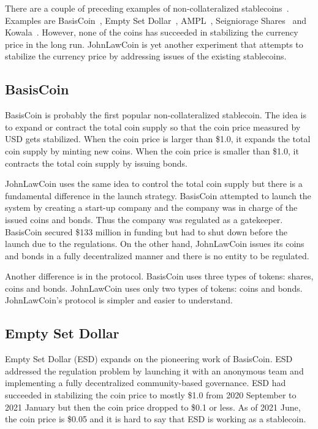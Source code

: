 \documentclass[dvipdfmx,a4paper]{article}
\begin{document}
There are a couple of preceding examples of non-collateralized stablecoins~\cite{mita2019stablecoin,klages2020stablecoins}. Examples are BasisCoin~\cite{basiscoin}, Empty Set Dollar~\cite{emptysetdollar}, AMPL~\cite{ampl}, Seigniorage Shares~\cite{seigniorage} and Kowala~\cite{kowala}. However, none of the coins has succeeded in stabilizing the currency price in the long run. JohnLawCoin is yet another experiment that attempts to stabilize the currency price by addressing issues of the existing stablecoins.

\subsection{BasisCoin}

BasisCoin is probably the first popular non-collateralized stablecoin. The idea is to expand or contract the total coin supply so that the coin price measured by USD gets stabilized. When the coin price is larger than \$1.0, it expands the total coin supply by minting new coins. When the coin price is smaller than \$1.0, it contracts the total coin supply by issuing bonds.

JohnLawCoin uses the same idea to control the total coin supply but there is a fundamental difference in the launch strategy. BasisCoin attempted to launch the system by creating a start-up company and the company was in charge of the issued coins and bonds. Thus the company was regulated as a gatekeeper. BasisCoin secured \$133 million in funding but had to shut down before the launch due to the regulations. On the other hand, JohnLawCoin issues its coins and bonds in a fully decentralized manner and there is no entity to be regulated.

Another difference is in the protocol. BasisCoin uses three types of tokens: shares, coins and bonds. JohnLawCoin uses only two types of tokens: coins and bonds. JohnLawCoin's protocol is simpler and easier to understand.

\subsection{Empty Set Dollar}

Empty Set Dollar (ESD) expands on the pioneering work of BasisCoin. ESD addressed the regulation problem by launching it with an anonymous team and implementing a fully decentralized community-based governance. ESD had succeeded in stabilizing the coin price to mostly \$1.0 from 2020 September to 2021 January but then the coin price dropped to \$0.1 or less. As of 2021 June, the coin price is \$0.05 and it is hard to say that ESD is working as a stablecoin.
\end{document}
